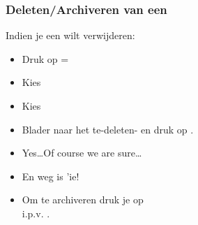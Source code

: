 \begin{frame}
\frametitle{Deleten/Archiveren van een \tiPRGM}

Indien je een  wilt verwijderen:
\begin{itemize}
  \item<2-> Druk op \tiSecond\tiPlus=\tiMEM
  \item<3-> Kies 
  \item<4-> Kies 
  \item<5-> Blader naar het te-deleten- en druk op \tiDEL.
  \item<6-> Yes\ldots Of course we are sure\ldots
  \item<7-> En weg is 'ie!
\end{itemize}
  
\begin{itemize}
  \item<8-> Om te archiveren druk je op \tiENTER\\
  	i.p.v. \tiDEL.
\end{itemize}

\vspace{1cm}


\end{frame}
